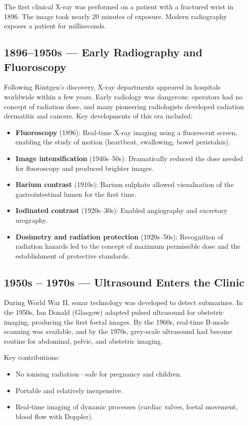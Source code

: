 \begin{pearlbox}
The first clinical X-ray was performed on a patient with a fractured wrist in 1896. The image took nearly 20 minutes of exposure. Modern radiography exposes a patient for milliseconds.
\end{pearlbox}

\subsection*{1896--1950s --- Early Radiography and Fluoroscopy}
Following R\"{o}ntgen's discovery, X-ray departments appeared in hospitals worldwide within a few years. Early radiology was dangerous: operators had no concept of radiation dose, and many pioneering radiologists developed radiation dermatitis and cancers. Key developments of this era included:
\begin{itemize}
    \item \textbf{Fluoroscopy} (1896): Real-time X-ray imaging using a fluorescent screen, enabling the study of motion (heartbeat, swallowing, bowel peristalsis).
    \item \textbf{Image intensification} (1940s--50s): Dramatically reduced the dose needed for fluoroscopy and produced brighter images.
    \item \textbf{Barium contrast} (1910s): Barium sulphate allowed visualisation of the gastrointestinal lumen for the first time.
    \item \textbf{Iodinated contrast} (1920s--30s): Enabled angiography and excretory urography.
    \item \textbf{Dosimetry and radiation protection} (1920s--50s): Recognition of radiation hazards led to the concept of maximum permissible dose and the establishment of protective standards.
\end{itemize}

\subsection*{1950s -- 1970s --- Ultrasound Enters the Clinic}
During World War II, sonar technology was developed to detect submarines. In the 1950s, Ian Donald (Glasgow) adapted pulsed ultrasound for obstetric imaging, producing the first foetal images. By the 1960s, real-time B-mode scanning was available, and by the 1970s, grey-scale ultrasound had become routine for abdominal, pelvic, and obstetric imaging.

Key contributions:
\begin{itemize}
    \item No ionising radiation---safe for pregnancy and children.
    \item Portable and relatively inexpensive.
    \item Real-time imaging of dynamic processes (cardiac valves, foetal movement, blood flow with Doppler).
\end{itemize}

